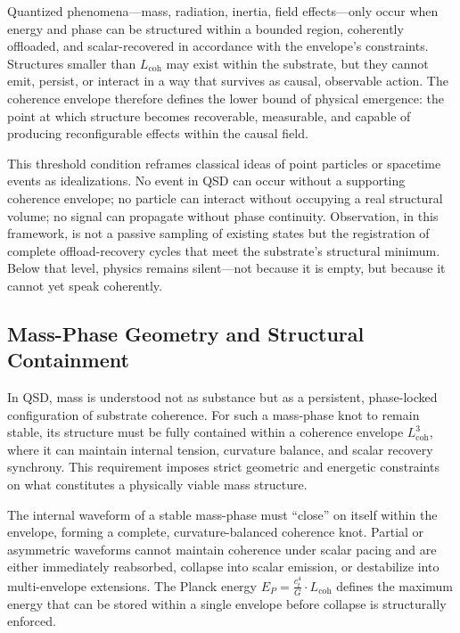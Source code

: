 \documentclass[entropy,article,submit,pdftex,moreauthors]{Definitions/mdpi}
\begin{document}
Quantized phenomena—mass, radiation, inertia, field effects—only occur when energy and phase can be structured within a bounded region, coherently offloaded, and scalar-recovered in accordance with the envelope’s constraints. Structures smaller than \texorpdfstring{\( L_{\text{coh}} \)}{Lcoh} may exist within the substrate, but they cannot emit, persist, or interact in a way that survives as causal, observable action. The coherence envelope therefore defines the lower bound of physical emergence: the point at which structure becomes recoverable, measurable, and capable of producing reconfigurable effects within the causal field.

This threshold condition reframes classical ideas of point particles or spacetime events as idealizations. No event in QSD can occur without a supporting coherence envelope; no particle can interact without occupying a real structural volume; no signal can propagate without phase continuity. Observation, in this framework, is not a passive sampling of existing states but the registration of complete offload-recovery cycles that meet the substrate’s structural minimum. Below that level, physics remains silent—not because it is empty, but because it cannot yet speak coherently.
\subsection{Mass-Phase Geometry and Structural Containment}

In QSD, mass is understood not as substance but as a persistent, phase-locked configuration of substrate coherence. For such a mass-phase knot to remain stable, its structure must be fully contained within a coherence envelope \texorpdfstring{\( L_{\text{coh}}^3 \)}{Lcoh\^{}3}, where it can maintain internal tension, curvature balance, and scalar recovery synchrony. This requirement imposes strict geometric and energetic constraints on what constitutes a physically viable mass structure.

The internal waveform of a stable mass-phase must “close” on itself within the envelope, forming a complete, curvature-balanced coherence knot. Partial or asymmetric waveforms cannot maintain coherence under scalar pacing and are either immediately reabsorbed, collapse into scalar emission, or destabilize into multi-envelope extensions. The Planck energy \texorpdfstring{\( E_P = \frac{c_t^4}{G} \cdot L_{\text{coh}} \)}{Ep = (ct\^{}4 / G) * Lcoh} defines the maximum energy that can be stored within a single envelope before collapse is structurally enforced.
\end{document}
